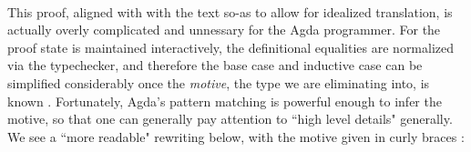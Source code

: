 \begin{code}
\>[12]\AgdaSpace{}%
\AgdaSymbol{(}\AgdaSpace{}%
\AgdaSpace{}%
\AgdaOperator{\AgdaFunction{+}}\AgdaSpace{}%
\AgdaSpace{}%
\AgdaOperator{\AgdaFunction{+}}\AgdaSpace{}%
\AgdaSymbol{)}\AgdaSpace{}%
\AgdaSpace{}%
\AgdaSymbol{(}\AgdaSpace{}%
\AgdaSpace{}%
\AgdaOperator{\AgdaFunction{+}}\AgdaSpace{}%
\AgdaSymbol{(}\AgdaSpace{}%
\AgdaOperator{\AgdaFunction{+}}\AgdaSpace{}%
\AgdaSymbol{))}\<%
\\
%
\>[4]\AgdaSpace{}%
\AgdaSpace{}%
\AgdaSpace{}%
\AgdaSymbol{=}\AgdaSpace{}%
\<%
\end{code}

This proof, aligned with with the text so-as to allow for idealized translation,
is actually overly complicated and unnessary for the Agda programmer. For the
proof state is maintained interactively, the definitional equalities are
normalized via the typechecker, and therefore the base case and inductive case
can be simplified considerably once the \emph{motive}, the type we are
eliminating into, is known \cite{motive}. Fortunately, Agda's pattern matching
is powerful enough to infer the motive, so that one can generally pay attention
to ``high level details" generally. We see a ``more readable" rewriting below,
with the motive given in curly braces :

